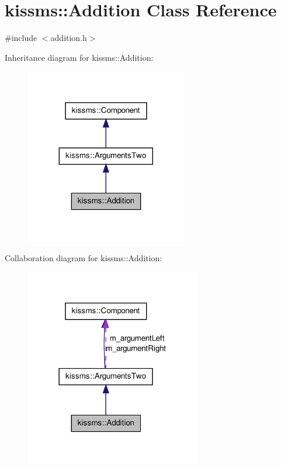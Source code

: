 \hypertarget{classkissms_1_1_addition}{\section{kissms\-:\-:Addition Class Reference}
\label{classkissms_1_1_addition}
}


{\ttfamily \#include $<$addition.\-h$>$}



Inheritance diagram for kissms\-:\-:Addition\-:
\nopagebreak
\begin{figure}[H]
\begin{center}
\leavevmode
\includegraphics[width=200pt]{classkissms_1_1_addition__inherit__graph}
\end{center}
\end{figure}


Collaboration diagram for kissms\-:\-:Addition\-:
\nopagebreak
\begin{figure}[H]
\begin{center}
\leavevmode
\includegraphics[width=218pt]{classkissms_1_1_addition__coll__graph}
\end{center}
\end{figure}
